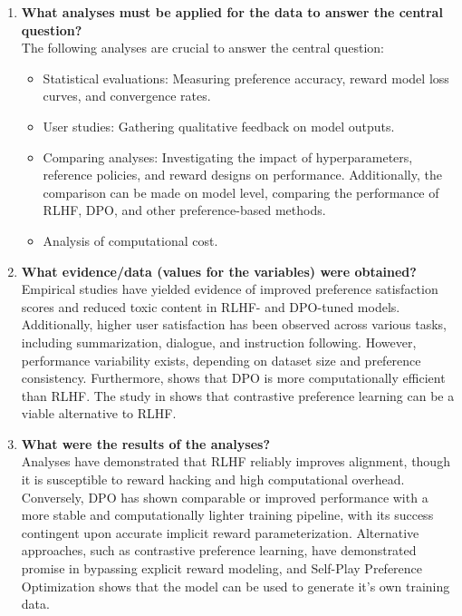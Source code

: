 \documentclass[a4paper,oneside,10pt,ngerman,english]{scrartcl}
\begin{document}
\begin{enumerate}
    \item \textbf{What analyses must be applied for the data to answer the central question?} \\
    The following analyses are crucial to answer the central question:
    \begin{itemize}
        \item Statistical evaluations: Measuring preference accuracy, reward model loss curves, and convergence rates.
        \item User studies: Gathering qualitative feedback on model outputs.
        \item Comparing analyses: Investigating the impact of hyperparameters, reference policies, and reward designs on performance. Additionally, the comparison can be made on model level, comparing the performance of RLHF, DPO, and other preference-based methods.
        \item Analysis of computational cost.
    \end{itemize}

    \item \textbf{What evidence/data (values for the variables) were obtained?} \\
    Empirical studies have yielded evidence of improved preference satisfaction scores and reduced toxic content in RLHF- and DPO-tuned models. Additionally, higher user satisfaction has been observed across various tasks, including summarization, dialogue, and instruction following. However, performance variability exists, depending on dataset size and preference consistency. Furthermore, \cite{bib:Rafailov2023} shows that DPO is more computationally efficient than RLHF. The study in \cite{bib:Zhao2023} shows that contrastive preference learning can be a viable alternative to RLHF.

    \item \textbf{What were the results of the analyses?} \\
    Analyses have demonstrated that RLHF reliably improves alignment, though it is susceptible to reward hacking and high computational overhead. Conversely, DPO has shown comparable or improved performance with a more stable and computationally lighter training pipeline, with its success contingent upon accurate implicit reward parameterization. Alternative approaches, such as contrastive preference learning, have demonstrated promise in bypassing explicit reward modeling, and Self-Play Preference Optimization shows that the model can be used to generate it's own training data.


\end{enumerate}
\end{document}
